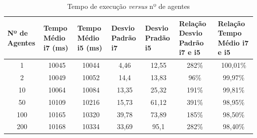 \documentclass[conference]{IEEEtran}
\begin{document}
\begin{table}[ht]
\centering
\caption{Tempo de execução \textit{versus} nº de agentes}
\label{tab:resultadostab}
\begin{tabular}{|c|c|c|c|c|c|c|}
\hline
\multicolumn{1}{|l|}{Nº de Agentes} & \multicolumn{1}{l|}{Tempo Médio i7 (ms)} & \multicolumn{1}{l|}{Tempo Médio i5 (ms)} & \multicolumn{1}{l|}{Desvio Padrão i7} & \multicolumn{1}{l|}{Desvio Pradão i5} & \multicolumn{1}{l|}{Relação Desvio Padrão i7 e i5} & \multicolumn{1}{l|}{Relação Tempo Médio i7 e i5} \\ \hline
1                                   & 10045                                    & 10044                                    & 4,46                                  & 12,55                                 & 282\%                                              & 100,01\%                                         \\ \hline
2                                   & 10049                                    & 10052                                    & 14,4                                  & 13,83                                 & 96\%                                               & 99,97\%                                          \\ \hline
10                                  & 10064                                    & 10084                                    & 13,35                                 & 25,32                                 & 191\%                                              & 99,81\%                                          \\ \hline
50                                  & 10109                                    & 10216                                    & 15,73                                 & 61,12                                 & 391\%                                              & 98,95\%                                          \\ \hline
100                                 & 10165                                    & 10320                                    & 39,78                                 & 73,89                                 & 185\%                                              & 98,50\%                                          \\ \hline
200                                 & 10168                                    & 10334                                    & 33,69                                 & 95,1                                  & 282\%                                              & 98,40\%                                          \\ \hline

\end{tabular}
\end{table}
\end{document}
